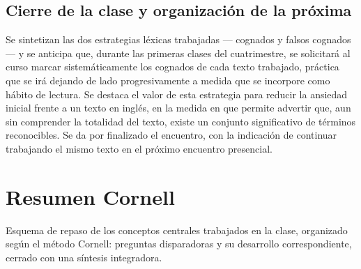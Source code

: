 \documentclass[12pt,oneside]{book}
\begin{document}
\section{Cierre de la clase y organización de la próxima}

Se sintetizan las dos estrategias léxicas trabajadas --- cognados y falsos cognados --- y se anticipa que, durante las primeras clases del cuatrimestre, se solicitará al curso marcar sistemáticamente los cognados de cada texto trabajado, práctica que se irá dejando de lado progresivamente a medida que se incorpore como hábito de lectura. Se destaca el valor de esta estrategia para reducir la ansiedad inicial frente a un texto en inglés, en la medida en que permite advertir que, aun sin comprender la totalidad del texto, existe un conjunto significativo de términos reconocibles. Se da por finalizado el encuentro, con la indicación de continuar trabajando el mismo texto en el próximo encuentro presencial.

\chapter*{Resumen Cornell}

Esquema de repaso de los conceptos centrales trabajados en la clase, organizado según el método Cornell: preguntas disparadoras y su desarrollo correspondiente, cerrado con una síntesis integradora.
\end{document}
